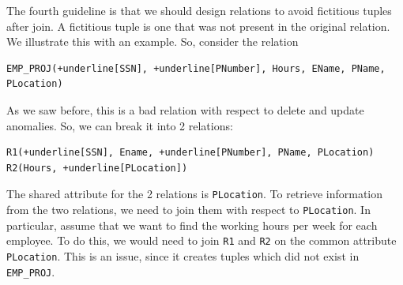 \documentclass[a4paper, openany]{memoir}
\begin{document}
The fourth guideline is that we should design relations to avoid fictitious tuples after join. A fictitious tuple is one that was not present in the original relation. We illustrate this with an example. So, consider the relation
\begin{Verbatim}[commandchars=+\[\]]
EMP_PROJ(+underline[SSN], +underline[PNumber], Hours, EName, PName, PLocation)
\end{Verbatim}
As we saw before, this is a bad relation with respect to delete and update anomalies. So, we can break it into 2 relations: 
\begin{Verbatim}[commandchars=+\[\]]
R1(+underline[SSN], Ename, +underline[PNumber], PName, PLocation)
R2(Hours, +underline[PLocation])
\end{Verbatim}
The shared attribute for the 2 relations is \texttt{PLocation}. 
To retrieve information from the two relations, we need to join them with respect to \texttt{PLocation}. In particular, assume that we want to find the working hours per week for each employee. To do this, we would need to join \texttt{R1} and \texttt{R2} on the common attribute \texttt{PLocation}. This is an issue, since it creates tuples which did not exist in \texttt{EMP\_PROJ}.
\end{document}
